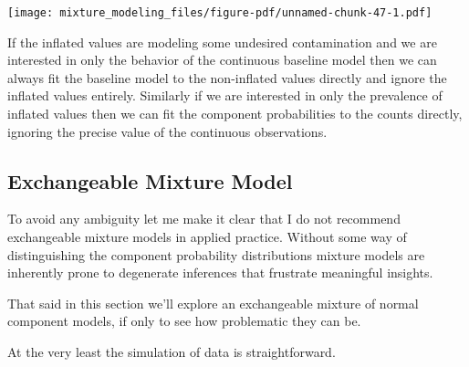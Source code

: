 \documentclass[
  letterpaper,
  DIV=11,
  numbers=noendperiod]{scrartcl}
\begin{document}
\texttt{[image: mixture\_modeling\_files/figure-pdf/unnamed-chunk-47-1.pdf]}

If the inflated values are modeling some undesired contamination and we
are interested in only the behavior of the continuous baseline model
then we can always fit the baseline model to the non-inflated values
directly and ignore the inflated values entirely. Similarly if we are
interested in only the prevalence of inflated values then we can fit the
component probabilities to the counts directly, ignoring the precise
value of the continuous observations.

\subsection{Exchangeable Mixture
Model}\label{exchangeable-mixture-model}

To avoid any ambiguity let me make it clear that I do not recommend
exchangeable mixture models in applied practice. Without some way of
distinguishing the component probability distributions mixture models
are inherently prone to degenerate inferences that frustrate meaningful
insights.

That said in this section we'll explore an exchangeable mixture of
normal component models, if only to see how problematic they can be.

At the very least the simulation of data is straightforward.
\end{document}
